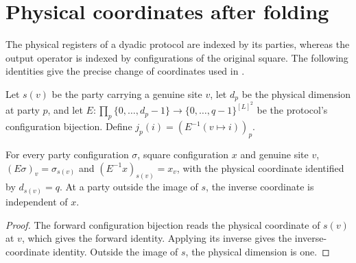 \section{Physical coordinates after folding}
\label{sec:peps_dyadic_physical_readout}

The physical registers of a dyadic protocol are indexed by its parties,
whereas the output operator is indexed by configurations of the original
square. The following identities give the precise change of coordinates
used in \cite[Section~8]{OpenAI2026PolynomialPEPS}.

\begin{definition}
    \label{def:peps_dyadic_local_readout}
    \leanok
    Let $s(v)$ be the party carrying a genuine site $v$, let $d_p$ be the
    physical dimension at party $p$, and let
    $E:\prod_p\{0,\ldots,d_p-1\}\to\{0,\ldots,q-1\}^{[L]^2}$
    be the protocol's configuration bijection. Define
    $j_p(i)=(E^{-1}(v\mapsto i))_p$.
\end{definition}

\begin{theorem}
    \label{thm:peps_dyadic_physical_coordinates}
    \leanok
    For every party configuration $\sigma$, square configuration $x$ and
    genuine site $v$, $(E\sigma)_v=\sigma_{s(v)}$ and
    $(E^{-1}x)_{s(v)}=x_v$, with the physical coordinate identified by
    $d_{s(v)}=q$. At a party outside the image of $s$, the inverse coordinate
    is independent of $x$.
\end{theorem}
\begin{proof}\leanok
    The forward configuration bijection reads the physical coordinate of
    $s(v)$ at $v$, which gives the forward identity. Applying its inverse
    gives the inverse-coordinate identity.
    Outside the image of $s$, the physical dimension is one.
\end{proof}

